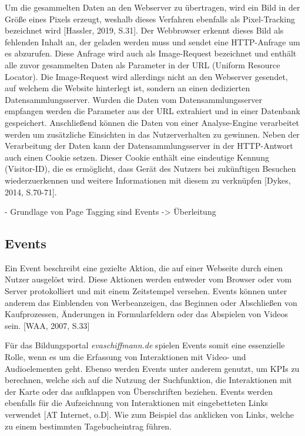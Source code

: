 Um die gesammelten Daten an den Webserver zu übertragen, wird ein Bild in der Größe eines Pixels erzeugt, weshalb dieses Verfahren ebenfalls als Pixel-Tracking bezeichnet wird [Hassler, 2019, S.31]. Der Webbrowser erkennt dieses Bild als fehlenden Inhalt an, der geladen werden muss und sendet eine HTTP-Anfrage um es abzurufen. Diese Anfrage wird auch als Image-Request bezeichnet und enthält alle zuvor gesammelten Daten als Parameter in der URL (Uniform Resource Locator). Die Image-Request wird allerdings nicht an den Webserver gesendet, auf welchem die Website hinterlegt ist, sondern an einen dedizierten Datensammlungsserver. Wurden die Daten vom Datensammlungsserver empfangen werden die Parameter aus der URL extrahiert und in einer Datenbank gespeichert. Anschließend können die Daten von einer Analyse-Engine verarbeitet werden um zusätzliche Einsichten in das Nutzerverhalten zu gewinnen. Neben der Verarbeitung der Daten kann der Datensammlungsserver in der HTTP-Antwort auch einen Cookie setzen. Dieser Cookie enthält eine eindeutige Kennung (Visitor-ID), die es ermöglicht, dass Gerät des Nutzers bei zukünftigen Besuchen wiederzuerkennen und weitere Informationen mit diesem zu verknüpfen [Dykes, 2014, S.70-71].

- Grundlage von Page Tagging sind Events -> Überleitung

\subsection{Events}
Ein Event beschreibt eine gezielte Aktion, die auf einer Webseite durch einen Nutzer ausgelöst wird. Diese Aktionen werden entweder vom Browser oder vom Server protokolliert und mit einem Zeitstempel versehen. Events können unter anderem das Einblenden von Werbeanzeigen, das Beginnen oder Abschließen von Kaufprozessen, Änderungen in Formularfeldern oder das Abspielen von Videos sein. [WAA, 2007, S.33]

Für das Bildungsportal \textit{evaschiffmann.de} spielen Events somit eine essenzielle Rolle, wenn es um die Erfassung von Interaktionen mit Video- und Audioelementen geht. Ebenso werden Events unter anderem genutzt, um KPIs zu berechnen, welche sich auf die Nutzung der Suchfunktion, die Interaktionen mit der Karte oder das aufklappen von Überschriften beziehen. Events werden ebenfalls für die Aufzeichnung von Interaktionen mit eingebetteten Links verwendet [AT Internet, o.D]. Wie zum Beispiel das anklicken von Links, welche zu einem bestimmten Tagebucheintrag führen.

